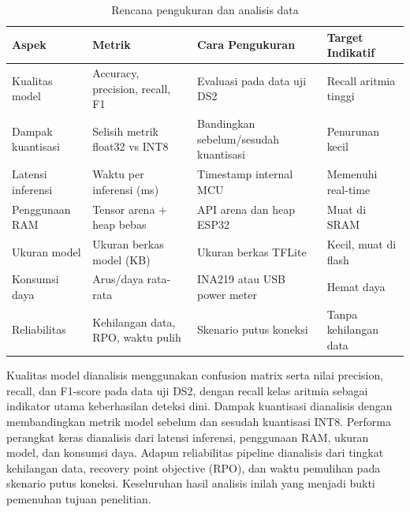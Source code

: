 \documentclass[11pt]{article}
\begin{document}
\begin{table}[H]\centering\footnotesize
\begin{tabular}{|p{2.0cm}|p{2.0cm}|p{2.6cm}|p{2.0cm}|}
\hline
\rowcolor{headgray}\textbf{Aspek} & \textbf{Metrik} & \textbf{Cara Pengukuran} & \textbf{Target Indikatif}\\\hline
Kualitas model & Accuracy, precision, recall, F1 & Evaluasi pada data uji DS2 & Recall aritmia tinggi\\\hline
Dampak kuantisasi & Selisih metrik float32 vs INT8 & Bandingkan sebelum/sesudah kuantisasi & Penurunan kecil\\\hline
Latensi inferensi & Waktu per inferensi (ms) & Timestamp internal MCU & Memenuhi real-time\\\hline
Penggunaan RAM & Tensor arena + heap bebas & API arena dan heap ESP32 & Muat di SRAM\\\hline
Ukuran model & Ukuran berkas model (KB) & Ukuran berkas TFLite & Kecil, muat di flash\\\hline
Konsumsi daya & Arus/daya rata-rata & INA219 atau USB power meter & Hemat daya\\\hline
Reliabilitas & Kehilangan data, RPO, waktu pulih & Skenario putus koneksi & Tanpa kehilangan data\\\hline
\end{tabular}
\caption{Rencana pengukuran dan analisis data}
\end{table}

Kualitas model dianalisis menggunakan confusion matrix serta nilai precision, recall, dan F1-score pada data uji DS2, dengan recall kelas aritmia sebagai indikator utama keberhasilan deteksi dini. Dampak kuantisasi dianalisis dengan membandingkan metrik model sebelum dan sesudah kuantisasi INT8. Performa perangkat keras dianalisis dari latensi inferensi, penggunaan RAM, ukuran model, dan konsumsi daya. Adapun reliabilitas pipeline dianalisis dari tingkat kehilangan data, recovery point objective (RPO), dan waktu pemulihan pada skenario putus koneksi. Keseluruhan hasil analisis inilah yang menjadi bukti pemenuhan tujuan penelitian.
\end{document}
